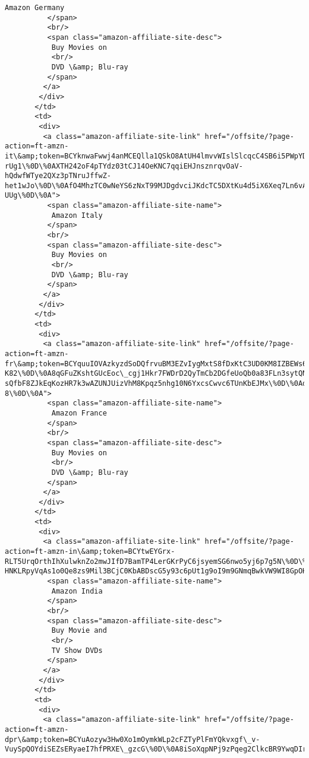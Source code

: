 \documentclass[11pt]{article}
\begin{document}
\begin{Verbatim}[commandchars=\\\{\}]
           Amazon Germany
          </span>
          <br/>
          <span class="amazon-affiliate-site-desc">
           Buy Movies on
           <br/>
           DVD \&amp; Blu-ray
          </span>
         </a>
        </div>
       </td>
       <td>
        <div>
         <a class="amazon-affiliate-site-link" href="/offsite/?page-action=ft-amzn-it\&amp;token=BCYknwaFwwj4anMCEQlla1QSkO8AtUH4lmvvWIslSlcqcC4SB6i5PWpYDj35eKvYWi\_sK\_i-rUg1\%0D\%0AXTH242oF4pTYdz03tCJ14OeKNC7qqiEHJnsznrqvOaV-hQdwfWTye2QXz3pTNruJffwZ-het1wJo\%0D\%0AfO4MhzTC0wNeYS6zNxT99MJDgdvciJKdcTC5DXtKu4d5iX6Xeq7Ln6vAPs1mWQPkIGGPEVXhinXt\%0D\%0Azae7ZHb-UUg\%0D\%0A">
          <span class="amazon-affiliate-site-name">
           Amazon Italy
          </span>
          <br/>
          <span class="amazon-affiliate-site-desc">
           Buy Movies on
           <br/>
           DVD \&amp; Blu-ray
          </span>
         </a>
        </div>
       </td>
       <td>
        <div>
         <a class="amazon-affiliate-site-link" href="/offsite/?page-action=ft-amzn-fr\&amp;token=BCYquuIOVAzkyzdSoDQfrvuBM3EZvIygMxtS8fDxKtC3UD0KM8IZBEWs6Z85nOp8hcayu3ew-K82\%0D\%0A8qGFuZKshtGUcEoc\_cgj1Hkr7FWDrD2QyTmCb2DGfeUoQb0a83FLn3sytQNcmu4F7rqmSKV7VIqe\%0D\%0A4in7vd5DUHONH-sQfbF8ZJkEqKozHR7k3wAZUNJUizVhM8Kpqz5nhg10N6YxcsCwvc6TUnKbEJMx\%0D\%0AdcPQoLD7m-8\%0D\%0A">
          <span class="amazon-affiliate-site-name">
           Amazon France
          </span>
          <br/>
          <span class="amazon-affiliate-site-desc">
           Buy Movies on
           <br/>
           DVD \&amp; Blu-ray
          </span>
         </a>
        </div>
       </td>
       <td>
        <div>
         <a class="amazon-affiliate-site-link" href="/offsite/?page-action=ft-amzn-in\&amp;token=BCYtwEYGrx-RLT5UrqOrthIhXulwknZo2mwJIfD7BamTP4LerGKrPyC6jsyemSG6nwo5yj6p7g5N\%0D\%0A-HNKLRpyVqAs1o0Qe8zs9Mil3BCjC0KbABDscG5y93c6pUt1g9oI9m9GNmqBwkVW9WI8GpOHQjg5\%0D\%0A2BPjstZ1yHI0FV67T5io31Lgz7viGPD2Nis11S\_lgt1noW0fbeHZ4A3iCTQxQh0GV95tcIQGlDRK\%0D\%0AG6L0KC8Uyp2QxiJXi82quH1Cig45UXwx\%0D\%0A">
          <span class="amazon-affiliate-site-name">
           Amazon India
          </span>
          <br/>
          <span class="amazon-affiliate-site-desc">
           Buy Movie and
           <br/>
           TV Show DVDs
          </span>
         </a>
        </div>
       </td>
       <td>
        <div>
         <a class="amazon-affiliate-site-link" href="/offsite/?page-action=ft-amzn-dpr\&amp;token=BCYuAozyw3Hw0Xo1mOymkWLp2cFZTyPlFmYQkvxgf\_v-VuySpQOYdiSEZsERyaeI7hfPRXE\_gzcG\%0D\%0A8iSoXqpNPj9zPqeg2ClkcBR9YwqDIrLcx30qNQNNzhG2DCiS64m8qIp6gVnlkh4lbvvwKeqZV9uP\%0D\%0AbbA8L6cfVBr261FhhnH9t98\%0D\%0A">

\end{Verbatim}
\end{document}
